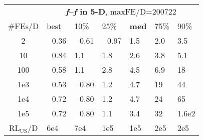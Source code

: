 \begin{tabular}{c|llllll}
 & \multicolumn{6}{|c}{\textbf{\textit{f}\raisebox{-0.35ex}{1}--\textit{f}\raisebox{-0.35ex}{24} in 5-D}, maxFE/D=200722}\\
\#FEs/D & best & 10\% & 25\% & \textbf{med} & 75\% & 90\%\\
2 & ~\,0.36 & ~\,0.61 & ~\,0.97 & \hspace*{1ex}1.5 & \hspace*{1ex}2.0 & \hspace*{1ex}3.5\\
10 & ~\,0.84 & \hspace*{1ex}1.1 & \hspace*{1ex}1.8 & \hspace*{1ex}2.6 & \hspace*{1ex}3.8 & \hspace*{1ex}5.1\\
100 & ~\,0.58 & \hspace*{1ex}1.1 & \hspace*{1ex}2.8 & \hspace*{1ex}4.5 & \hspace*{1ex}6.9 & 18\\
1e3 & ~\,0.53 & ~\,0.80 & \hspace*{1ex}1.2 & \hspace*{1ex}4.7 & 19 & 44\\
1e4 & ~\,0.72 & ~\,0.80 & \hspace*{1ex}1.2 & \hspace*{1ex}4.7 & 24 & 65\\
1e5 & ~\,0.72 & ~\,0.80 & \hspace*{1ex}1.1 & \hspace*{1ex}3.4 & 32 & 1.6e2\\
$\text{RL}_{\text{US}}$/D & 6e4 & 7e4 & 1e5 & 1e5 & 2e5 & 2e5
\end{tabular}
